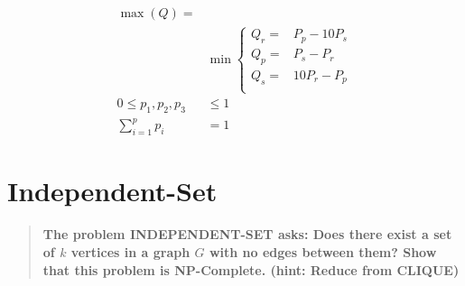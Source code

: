 \documentclass[titlepage]{article}\usepackage[]{graphicx}\usepackage[]{color}
\begin{document}
  \begin{equation}
    \begin{aligned}
      \label{rps:constraints}
      \max(Q) =& \\
      &\min \begin{cases} Q_r =& P_p - 10P_s \\
                    Q_p =& P_s - P_r   \\
                    Q_s =& 10P_r - P_p \\
                  \end{cases} \\
       0 \leq p_1, p_2, p_3 &\leq 1 \\ 
      \sum_{i=1}^p p_i &= 1 
    \end{aligned}
  \end{equation}

  
  \vspace{3cm}

\section{Independent-Set}
  \begin{quote}
  \textbf{The problem INDEPENDENT-SET asks: Does there exist a set of $k$
  vertices in a graph $G$ with no edges between them? Show that this problem is
  NP-Complete. (hint: Reduce from CLIQUE)}
  \end{quote}
\end{document}
